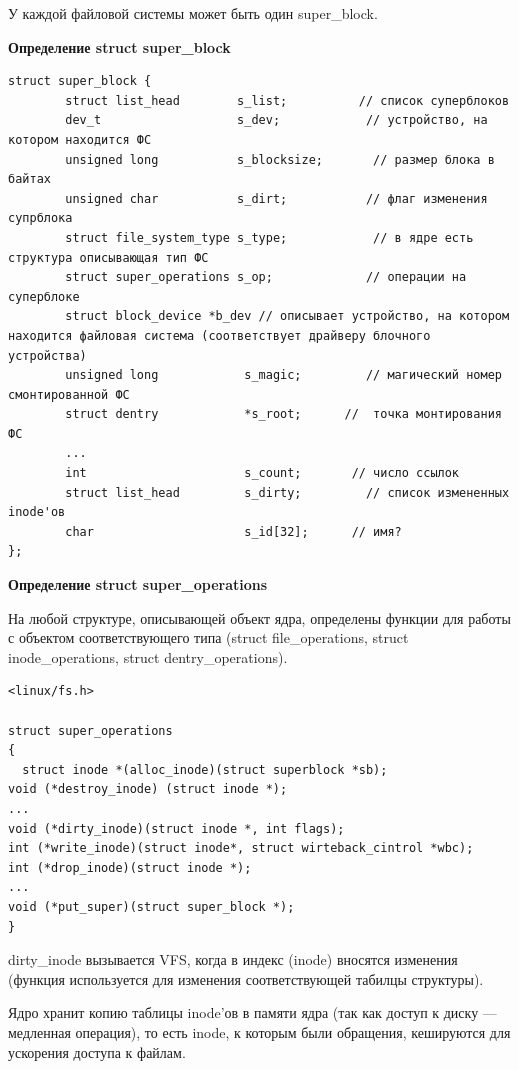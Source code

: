 У каждой файловой системы может быть один super\_block.

\textbf{Определение struct super\_block}

\begin{lstlisting}
struct super_block {
        struct list_head        s_list;          // список суперблоков  
        dev_t                   s_dev;            // устройство, на котором находится ФС
        unsigned long           s_blocksize;       // размер блока в байтах
        unsigned char           s_dirt;           // флаг изменения супрблока
        struct file_system_type s_type;            // в ядре есть структура описывающая тип ФС
        struct super_operations s_op;             // операции на суперблоке
        struct block_device *b_dev // описывает устройство, на котором находится файловая система (соответствует драйверу блочного устройства)
        unsigned long            s_magic;         // магический номер смонтированной ФС
        struct dentry            *s_root;      //  точка монтирования ФС
        ...
        int                      s_count;       // число ссылок
        struct list_head         s_dirty;         // список измененных inode'ов
        char                     s_id[32];      // имя?
};
\end{lstlisting}

\textbf{Определение struct super\_operations}

На любой структуре, описывающей объект ядра, определены функции для работы с объектом соответствующего типа (struct file\_operations, struct inode\_operations, struct dentry\_operations).

\begin{lstlisting}
<linux/fs.h>

struct super_operations
{
  struct inode *(alloc_inode)(struct superblock *sb);
void (*destroy_inode) (struct inode *);
...
void (*dirty_inode)(struct inode *, int flags);
int (*write_inode)(struct inode*, struct wirteback_cintrol *wbc);
int (*drop_inode)(struct inode *);
...
void (*put_super)(struct super_block *);
}

\end{lstlisting}


dirty\_inode вызывается VFS, когда в индекс (inode) вносятся изменения (функция используется для изменения соответствующей табилцы структуры).

Ядро хранит копию таблицы inode'ов в памяти ядра (так как доступ к диску — медленная операция), то есть inode, к которым были обращения, кешируются для ускорения доступа к файлам.

